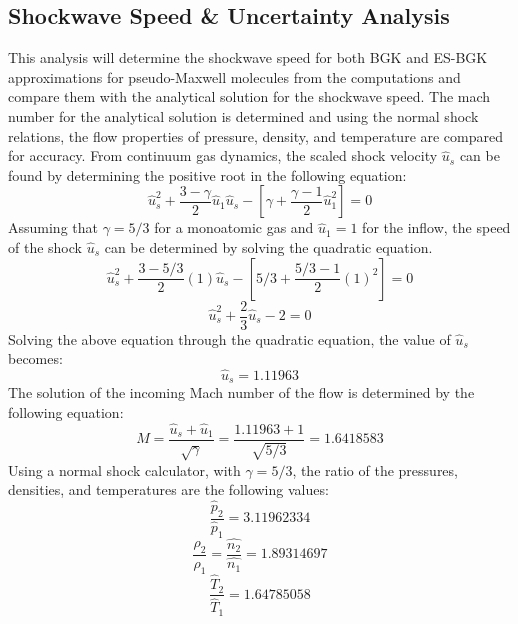 \documentclass[a4paper]{article}
\begin{document}
\subsection{Shockwave Speed \& Uncertainty Analysis}
This analysis will determine the shockwave speed for both BGK and ES-BGK approximations for pseudo-Maxwell molecules from the computations and compare them with the analytical solution for the shockwave speed. The mach number for the analytical solution is determined and using the normal shock relations, the flow properties of pressure, density, and temperature are compared for accuracy. From continuum gas dynamics, the scaled shock velocity $\hat{u}_s$ can be found by determining the positive root in the following equation:
\begin{equation}
    \hat{u}^2_s + \dfrac{3-\gamma}{2} \hat{u}_1 \hat{u}_s - \left[ \gamma +\dfrac{\gamma - 1}{2} \hat{u}^2_1\right] = 0
\end{equation}
Assuming that $\gamma = 5/3$ for a monoatomic gas and $\hat{u}_1 = 1$ for the inflow, the speed of the shock $\hat{u}_s$ can be determined by solving the quadratic equation.
\begin{equation}
    \hat{u}^2_s + \dfrac{3-5/3}{2}(1) \hat{u}_s - \left[5/3 +\dfrac{5/3 - 1}{2} (1)^2\right] = 0
\end{equation}
\begin{equation}
    \hat{u}^2_s +  \dfrac{2}{3}\hat{u}_s - 2 = 0
\end{equation}
Solving the above equation through the quadratic equation, the value of $\hat{u}_s$ becomes:
\begin{equation*}
    \hat{u}_s = 1.11963
\end{equation*}
The solution of the incoming Mach number of the flow is determined by the following equation:
\begin{equation}
    M = \dfrac{\hat{u}_s + \hat{u}_1}{\sqrt{\gamma}} = \dfrac{1.11963 + 1}{\sqrt{5/3}} = 1.6418583
\end{equation}
Using a normal shock calculator, with $\gamma = 5/3$, the ratio of the pressures, densities, and temperatures are the following values:
\begin{equation}
    \dfrac{\hat{p}_2}{\hat{p}_1} =  3.11962334
\end{equation}
\begin{equation}
    \dfrac{\rho_2}{\rho_1} = \dfrac{\hat{n_2}}{\hat{n_1}} = 1.89314697
\end{equation}
\begin{equation}
     \dfrac{\hat{T}_2}{\hat{T}_1} =1.64785058
\end{equation}
\end{document}
